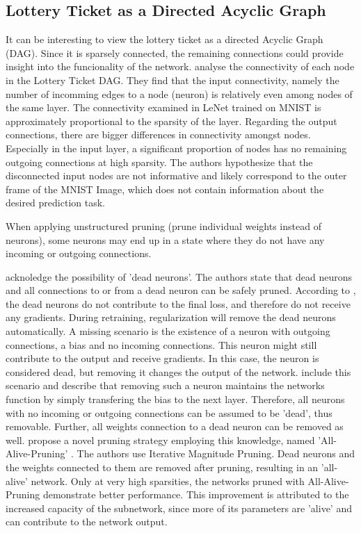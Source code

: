 \subsection{Lottery Ticket as a Directed Acyclic Graph}
It can be interesting to view the lottery ticket as a directed Acyclic Graph (DAG).
Since it is sparsely connected, the remaining connections could provide insight into the funcionality of the network.
\textcite{DBLP:conf/iclr/FrankleC19} analyse the connectivity of each node in the Lottery Ticket DAG.
They find that the input connectivity, namely the number of incomming edges to a node (neuron) is relatively even among nodes of the same layer.
The connectivity examined in LeNet trained on MNIST is approximately proportional to the sparsity of the layer.
Regarding the output connections, there are bigger differences in connectivity amongst nodes.
Especially in the input layer, a significant proportion of nodes has no remaining outgoing connections at high sparsity. 
The authors hypothesize that the disconnected input nodes are not informative and likely correspond to the outer frame of the MNIST Image, which does not contain information about the desired prediction task.

When applying unstructured pruning (prune individual weights instead of neurons), some neurons may end up in a state where they do not have any incoming or outgoing connections. 

\textcite{HanEtAl15} acknoledge the possibility of 'dead neurons'. 
The authors state that dead neurons and all connections to or from a dead neuron can be safely pruned.
According to \autocite{HanEtAl15}, the dead neurons do not contribute to the final loss, and therefore do not receive any gradients. 
During retraining, regularization will remove the dead neurons automatically. 
A missing scenario is the existence of a neuron with outgoing connections, a bias and no incoming connections. This neuron might still contribute to the output and receive gradients. 
In this case, the neuron is considered dead, but removing it changes the output of the network.
\textcite{AllAlivePruning} include this scenario and describe that removing such a neuron maintains the networks function by simply transfering the bias to the next layer. 
Therefore, all neurons with no incoming or outgoing connections can be assumed to be 'dead', thus removable. Further, all weights connection to a dead neuron can be removed as well.
\textcite{AllAlivePruning} propose a novel pruning strategy employing this knowledge, named 'All-Alive-Pruning' . 
The authors use Iterative Magnitude Pruning. Dead neurons and the weights connected to them are removed after pruning, resulting in an 'all-alive' network.
Only at very high sparsities, the networks pruned with All-Alive-Pruning demonstrate better performance. 
This improvement is attributed to the increased capacity of the subnetwork, since more of its parameters are 'alive' and can contribute to the network output.

